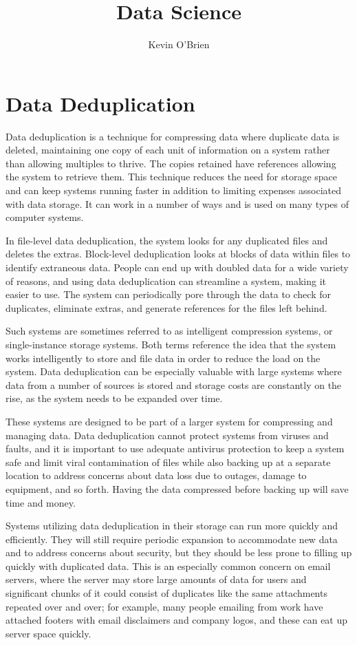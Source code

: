 \documentclass[12pt]{article}
\title{Data Science}
\author{Kevin O'Brien}
\begin{document}
	
	\section*{Data Deduplication}

Data deduplication is a technique for compressing data where duplicate data is deleted, maintaining one copy of each unit of information on a system rather than allowing multiples to thrive. The copies retained have references allowing the system to retrieve them. This technique reduces the need for storage space and can keep systems running faster in addition to limiting expenses associated with data storage. It can work in a number of ways and is used on many types of computer systems.

 

In file-level data deduplication, the system looks for any duplicated files and deletes the extras. Block-level deduplication looks at blocks of data within files to identify extraneous data. People can end up with doubled data for a wide variety of reasons, and using data deduplication can streamline a system, making it easier to use. The system can periodically pore through the data to check for duplicates, eliminate extras, and generate references for the files left behind.

 

Such systems are sometimes referred to as intelligent compression systems, or single-instance storage systems. Both terms reference the idea that the system works intelligently to store and file data in order to reduce the load on the system. Data deduplication can be especially valuable with large systems where data from a number of sources is stored and storage costs are constantly on the rise, as the system needs to be expanded over time.

 

These systems are designed to be part of a larger system for compressing and managing data. Data deduplication cannot protect systems from viruses and faults, and it is important to use adequate antivirus protection to keep a system safe and limit viral contamination of files while also backing up at a separate location to address concerns about data loss due to outages, damage to equipment, and so forth. Having the data compressed before backing up will save time and money.

 

Systems utilizing data deduplication in their storage can run more quickly and efficiently. They will still require periodic expansion to accommodate new data and to address concerns about security, but they should be less prone to filling up quickly with duplicated data. This is an especially common concern on email servers, where the server may store large amounts of data for users and significant chunks of it could consist of duplicates like the same attachments repeated over and over; for example, many people emailing from work have attached footers with email disclaimers and company logos, and these can eat up server space quickly.
\end{document}
